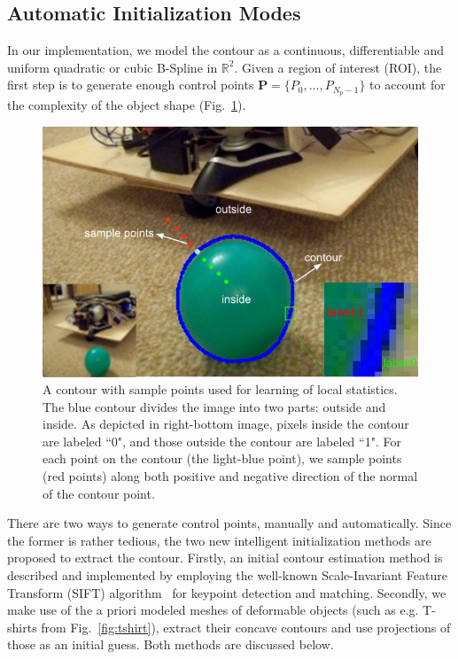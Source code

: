 \documentclass[conference]{IEEEtran}
\begin{document}
\subsection{Automatic Initialization Modes}
In our implementation, we model the
contour as a continuous, differentiable and uniform quadratic or cubic
B-Spline in $\mathbb{R}^2$.
Given a region of interest (ROI), the first step is to generate
enough control points $\mathbf{P} = \{P_0, \ldots, P_{N_p-1}\}$ to
account for the complexity of the object shape (Fig.~\ref{fig:prior}).

\begin{figure}[htb]
  \centering
  \includegraphics[width=\columnwidth]{cont.png}
\caption{A contour with sample points used for learning of local statistics. The blue contour
  divides the image into two parts: outside and inside. As depicted in
  right-bottom image, pixels inside the contour are labeled ``0",
  and those outside the contour are labeled ``1". For each point on the
  contour (the light-blue point), we sample points (red points) along both positive
  and negative direction of the normal of the contour point.}
\label{fig:prior}
\end{figure}

There are two ways to generate control points, manually and automatically. 
Since the former is rather tedious, the two new
intelligent initialization methods are proposed to extract the
contour. Firstly, an initial contour estimation method is described and
implemented by employing the well-known Scale-Invariant Feature Transform 
(SIFT) algorithm~\cite{lowe2004distinctive} for
keypoint detection and matching. Secondly, we make use of the a priori
modeled meshes of deformable objects (such as e.g. T-shirts from Fig.~\ref{fig:tshirt}), 
extract their concave contours and use projections of those as an initial guess. Both 
methods are discussed below.
\end{document}
